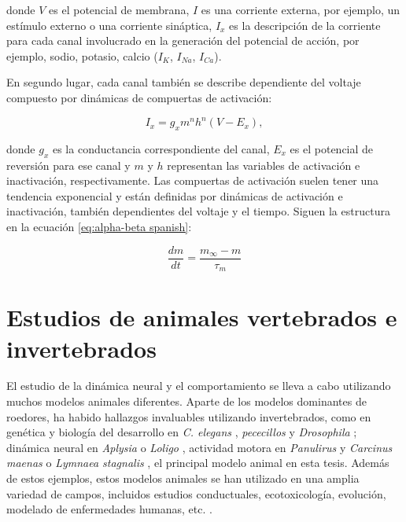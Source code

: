 donde \( V \) es el potencial de membrana, \( I \) es una corriente externa, por ejemplo, un estímulo externo o una corriente sináptica, \( I_{x} \) es la descripción de la corriente para cada canal involucrado en la generación del potencial de acción, por ejemplo, sodio, potasio, calcio (\( I_K \), \( I_{Na} \), \( I_{Ca} \)).

En segundo lugar, cada canal también se describe dependiente del voltaje compuesto por dinámicas de compuertas de activación:

\begin{equation}
I_x =  g_x m^n h^n (V - E_x),
\end{equation}

donde \( g_x \) es la conductancia correspondiente del canal, \( E_x \) es el potencial de reversión para ese canal y \( m \) y \( h \) representan las variables de activación e inactivación, respectivamente.
Las compuertas de activación suelen tener una tendencia exponencial y están definidas por dinámicas de activación e inactivación, también dependientes del voltaje y el tiempo. Siguen la estructura en la ecuación \ref{eq:alpha-beta spanish}:

\begin{equation}
\frac{dm}{dt} = \frac{m_{\infty} - m}{\tau_m}
\label{eq:alpha-beta spanish}
\end{equation}

\section{Estudios de animales vertebrados e invertebrados}
\label{c-intro-invertebrates spanish}
El estudio de la dinámica neural y el comportamiento se lleva a cabo utilizando muchos modelos animales diferentes. Aparte de los modelos dominantes de roedores, ha habido hallazgos invaluables utilizando invertebrados, como en genética y biología del desarrollo en \textit{C. elegans} \parencite{brenner_genetics_1974}, \textit{pececillos} \parencite{streisinger_production_1981} y \textit{Drosophila} \parencite{nusslein-volhard_mutations_1980}; dinámica neural en \textit{Aplysia} \parencite{wachtel_direct_1967} o \textit{Loligo} \parencite{HODGKIN1952}, actividad motora en \textit{Panulirus} \parencite{SELVERSTON1976} y \textit{Carcinus maenas} \parencite{eisen_mechanisms_1982} o \textit{Lymnaea stagnalis} \parencite{Benjamin1979b}, el principal modelo animal en esta tesis. Además de estos ejemplos, estos modelos animales se han utilizado en una amplia variedad de campos, incluidos estudios conductuales, ecotoxicología, evolución, modelado de enfermedades humanas, etc. \parencite{romanova_animal_2018}.

